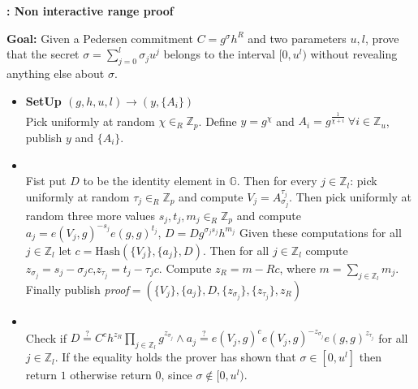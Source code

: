 \begin{algorithm}[H]
\caption{\textbf{: Non interactive range proof}}
\textbf{Goal:} Given a Pedersen commitment $C=g^\sigma h^R$ and two parameters $u,l$, prove that the secret $\sigma=\sum_{j=0}^l \sigma_ju^j$ belongs to the interval $[0,u^l)$ without revealing anything else about $\sigma$.
\vspace{2pt}
\hline
\vspace{2pt}
\begin{itemize}
  \item\textbf{SetUp $(g,h,u,l)\xrightarrow[]{}(y,\{A_{i}\})$}\\
Pick uniformly at random $\chi\in_R\mathds{Z}_p$. Define $y=g^\chi$ and $A_i=g^{\frac{1}{\chi+i}} \: \forall i\in\mathds{Z}_u$, publish $y$ and $\{A_i\}$.

\item{}\\
Fist put $D$ to be the identity element in $\mathds{G}$. Then for every $j\in\mathds{Z}_l$: pick uniformly at random $\tau_j\in_R\mathds{Z}_p$ and compute $V_j=A_{\sigma_j}^{\tau_j}$. Then pick uniformly at random three more values $s_j,t_j,m_j\in_R\mathds{Z}_p$ and compute $a_j=e(V_j,g)^{-s_j}e(g,g)^{t_j}$, $D=Dg^{\sigma_js_j}h^{m_j}$ Given these computations for all $j\in\mathds{Z}_l$ let $c=\text{Hash}(\{V_j\},\{a_j\},D)$. Then for all $j\in\mathds{Z}_l$ compute $z_{\sigma_j}=s_j-\sigma_jc$,$z_{\tau_j}=t_j-\tau_jc$. Compute $z_R=m-Rc$, where $m=\sum_{j\in\mathds{Z}_l}m_j$. Finally publish \textit{proof}$=(\{V_j\},\{a_j\},D,\{z_{\sigma_j}\},\{z_{\tau_j}\},z_R)$ 

\item{}\\
Check if $D\overset{?}{=}C^ch^{z_R}\prod_{j\in\mathds{Z}_l}g^{z_{\sigma_j}}\wedge a_j \overset{?}{=} e(V_j,g)^c e(V_j,g)^{-z_{\sigma_j}}e(g,g)^{z_{\tau_j}}$ for all $j\in\mathds{Z}_l$. If the equality holds the prover has shown that $\sigma\in[0,u^l]$ then return $1$ otherwise return $0$, since $\sigma\notin[0,u^l)$.
\end{itemize}
\label{alg:ZKRP}
\end{algorithm}


